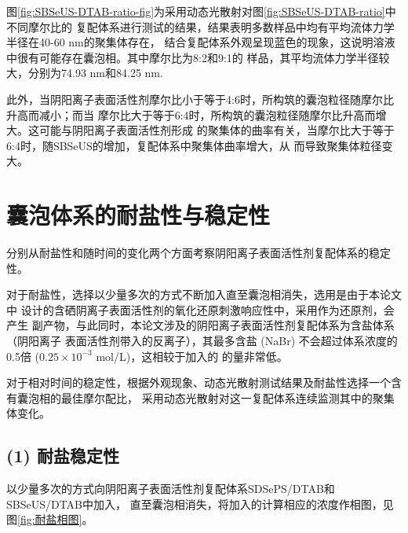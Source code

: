 \documentclass[bachelor,winfonts,replaceperiod]{jnuthesis}
\begin{document}
    图\ref{fig:SBSeUS-DTAB-ratio-fig}为采用动态光散射对图\ref{fig:SBSeUS-DTAB-ratio}中不同摩尔比的
    复配体系进行测试的结果，结果表明多数样品中均有平均流体力学半径在40-60 nm的聚集体存在，
    结合复配体系外观呈现蓝色的现象，这说明溶液中很有可能存在囊泡相。其中摩尔比为8:2和9:1的
    样品，其平均流体力学半径较大，分别为74.93 nm和84.25 nm.
    
    此外，当阴阳离子表面活性剂摩尔比小于等于4:6时，所构筑的囊泡粒径随摩尔比升高而减小；而当
    摩尔比大于等于6:4时，所构筑的囊泡粒径随摩尔比升高而增大。这可能与阴阳离子表面活性剂形成
    的聚集体的曲率有关，当摩尔比大于等于6:4时，随SBSeUS的增加，复配体系中聚集体曲率增大，从
    而导致聚集体粒径变大\cite{杨成成2017}。
    
    \section{囊泡体系的耐盐性与稳定性}
    分别从耐盐性和随时间的变化两个方面考察阴阳离子表面活性剂复配体系的稳定性。
    
    对于耐盐性，选择以少量多次的方式不断加入直至囊泡相消失，选用是由于本论文中
    设计的含硒阴离子表面活性剂的氧化还原刺激响应性中，采用作为还原剂，会产生
    副产物，与此同时，本论文涉及的阴阳离子表面活性剂复配体系为含盐体系（阴阳离子
    表面活性剂带入的反离子），其最多含盐 (NaBr) 不会超过体系浓度的0.5倍 ($0.25 \times 10^{-3}$ mol/L)，这相较于加入的
    的量非常低。
    
    对于相对时间的稳定性，根据外观现象、动态光散射测试结果及耐盐性选择一个含有囊泡相的最佳摩尔配比，
    采用动态光散射对这一复配体系连续监测其中的聚集体变化。
    
    \subsection*{(1) 耐盐稳定性}
    以少量多次的方式向阴阳离子表面活性剂复配体系SDSePS/DTAB和SBSeUS/DTAB中加入，
    直至囊泡相消失，将加入的计算相应的浓度作相图，见图\ref{fig:耐盐相图}。
\end{document}
